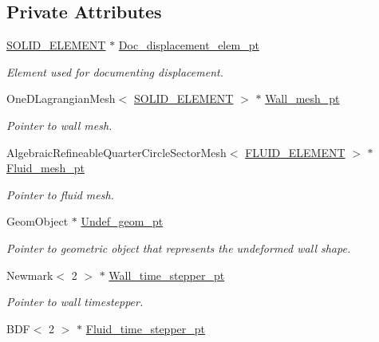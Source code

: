 \subsection*{Private Attributes}
\begin{DoxyCompactItemize}
\item 
\hyperlink{classFSIRingProblem_a96528378f3baf6100aeb6b4fe83bc870}{S\+O\+L\+I\+D\+\_\+\+E\+L\+E\+M\+E\+NT} $\ast$ \hyperlink{classFSIRingProblem_a85d9441c676456c71dffc27500bd0fec}{Doc\+\_\+displacement\+\_\+elem\+\_\+pt}
\begin{DoxyCompactList}\small\item\em Element used for documenting displacement. \end{DoxyCompactList}\item 
One\+D\+Lagrangian\+Mesh$<$ \hyperlink{classFSIRingProblem_a96528378f3baf6100aeb6b4fe83bc870}{S\+O\+L\+I\+D\+\_\+\+E\+L\+E\+M\+E\+NT} $>$ $\ast$ \hyperlink{classFSIRingProblem_a112c5285b6ea49d0e003fc3bdd817332}{Wall\+\_\+mesh\+\_\+pt}
\begin{DoxyCompactList}\small\item\em Pointer to wall mesh. \end{DoxyCompactList}\item 
Algebraic\+Refineable\+Quarter\+Circle\+Sector\+Mesh$<$ \hyperlink{classFSIRingProblem_a2ce9ba3122272853bfa6ec3fcf39b78a}{F\+L\+U\+I\+D\+\_\+\+E\+L\+E\+M\+E\+NT} $>$ $\ast$ \hyperlink{classFSIRingProblem_a33eec722bed7a0b02444c64d3e6c66fe}{Fluid\+\_\+mesh\+\_\+pt}
\begin{DoxyCompactList}\small\item\em Pointer to fluid mesh. \end{DoxyCompactList}\item 
Geom\+Object $\ast$ \hyperlink{classFSIRingProblem_a1c7dfd9d2798fb518403e5ef99f1f69c}{Undef\+\_\+geom\+\_\+pt}
\begin{DoxyCompactList}\small\item\em Pointer to geometric object that represents the undeformed wall shape. \end{DoxyCompactList}\item 
Newmark$<$ 2 $>$ $\ast$ \hyperlink{classFSIRingProblem_a67d7e17b8b0513e793f94fa4357b5784}{Wall\+\_\+time\+\_\+stepper\+\_\+pt}
\begin{DoxyCompactList}\small\item\em Pointer to wall timestepper. \end{DoxyCompactList}\item 
B\+DF$<$ 2 $>$ $\ast$ \hyperlink{classFSIRingProblem_a6abf3345b68a0b4b671758439340138e}{Fluid\+\_\+time\+\_\+stepper\+\_\+pt}

\end{DoxyCompactItemize}

